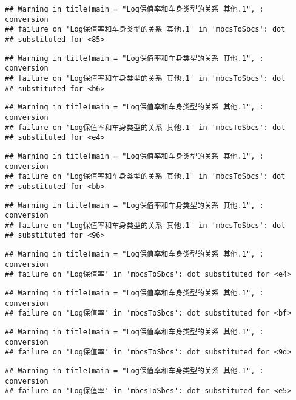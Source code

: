 \documentclass[]{article}
\begin{document}
\begin{verbatim}
## Warning in title(main = "Log保值率和车身类型的关系 其他.1", : conversion
## failure on 'Log保值率和车身类型的关系 其他.1' in 'mbcsToSbcs': dot
## substituted for <85>
\end{verbatim}

\begin{verbatim}
## Warning in title(main = "Log保值率和车身类型的关系 其他.1", : conversion
## failure on 'Log保值率和车身类型的关系 其他.1' in 'mbcsToSbcs': dot
## substituted for <b6>
\end{verbatim}

\begin{verbatim}
## Warning in title(main = "Log保值率和车身类型的关系 其他.1", : conversion
## failure on 'Log保值率和车身类型的关系 其他.1' in 'mbcsToSbcs': dot
## substituted for <e4>
\end{verbatim}

\begin{verbatim}
## Warning in title(main = "Log保值率和车身类型的关系 其他.1", : conversion
## failure on 'Log保值率和车身类型的关系 其他.1' in 'mbcsToSbcs': dot
## substituted for <bb>
\end{verbatim}

\begin{verbatim}
## Warning in title(main = "Log保值率和车身类型的关系 其他.1", : conversion
## failure on 'Log保值率和车身类型的关系 其他.1' in 'mbcsToSbcs': dot
## substituted for <96>
\end{verbatim}

\begin{verbatim}
## Warning in title(main = "Log保值率和车身类型的关系 其他.1", : conversion
## failure on 'Log保值率' in 'mbcsToSbcs': dot substituted for <e4>
\end{verbatim}

\begin{verbatim}
## Warning in title(main = "Log保值率和车身类型的关系 其他.1", : conversion
## failure on 'Log保值率' in 'mbcsToSbcs': dot substituted for <bf>
\end{verbatim}

\begin{verbatim}
## Warning in title(main = "Log保值率和车身类型的关系 其他.1", : conversion
## failure on 'Log保值率' in 'mbcsToSbcs': dot substituted for <9d>
\end{verbatim}

\begin{verbatim}
## Warning in title(main = "Log保值率和车身类型的关系 其他.1", : conversion
## failure on 'Log保值率' in 'mbcsToSbcs': dot substituted for <e5>
\end{verbatim}
\end{document}
